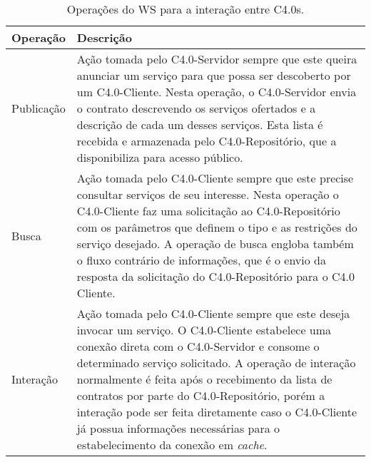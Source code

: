 \begin{table}[htb]
	\centering
	\caption{Operações do WS para a interação entre C4.0s.}
	\label{tab:operacoes-ws}
	\begin{tabular}{p{3cm}p{12cm}}
		\hline
		\textbf{Operação}
		 & \textbf{Descrição}                                                                                                                                                                                                                                                                                                                                                                                                                                                \\

		\hline
		Publicação
		 & Ação tomada pelo C4.0-Servidor sempre que este queira anunciar um serviço para que possa ser descoberto por um C4.0-Cliente. Nesta operação, o C4.0-Servidor envia o contrato descrevendo os serviços ofertados e a descrição de cada um desses serviços. Esta lista é recebida e armazenada pelo C4.0-Repositório, que a disponibiliza para acesso público.                                                                                                      \\

		\hline
		Busca
		 & Ação tomada pelo C4.0-Cliente sempre que este precise consultar serviços de seu interesse. Nesta operação o C4.0-Cliente faz uma solicitação ao C4.0-Repositório com os parâmetros que definem o tipo e as restrições do serviço desejado. A operação de busca engloba também o fluxo contrário de informações, que é o envio da resposta da solicitação do C4.0-Repositório para o C4.0 Cliente.                                                                 \\

		\hline
		Interação
		 & Ação tomada pelo C4.0-Cliente sempre que este deseja invocar um serviço. O C4.0-Cliente estabelece uma conexão direta com o C4.0-Servidor e consome o determinado serviço solicitado. A operação de interação normalmente é feita após o recebimento da lista de contratos por parte do C4.0-Repositório, porém a interação pode ser feita diretamente caso o C4.0-Cliente já possua informações necessárias para o estabelecimento da conexão em \textit{cache}. \\

		\hline
	\end{tabular}
\end{table}


